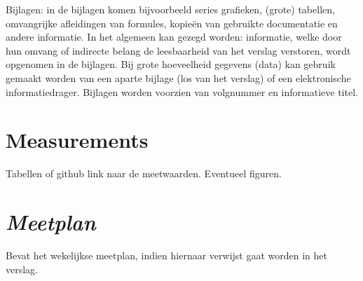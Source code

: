 \newpage
Bijlagen: in de bijlagen komen bijvoorbeeld series grafieken, (grote) tabellen, omvangrijke afleidingen van formules, kopieën van gebruikte documentatie en andere informatie. In het algemeen kan gezegd worden: informatie, welke door hun omvang of indirecte belang de leesbaarheid van het verslag verstoren, wordt opgenomen in de bijlagen. Bij grote hoeveelheid gegevens (data) kan gebruik gemaakt worden van een aparte bijlage (los van het verslag) of een elektronische informatiedrager. Bijlagen worden voorzien van volgnummer en informatieve titel.

\chapter{Measurements}
Tabellen of github link naar de meetwaarden. Eventueel figuren.

\chapter{\textit{Meetplan}}
Bevat het wekelijkse meetplan, indien hiernaar verwijst gaat worden in het verslag.